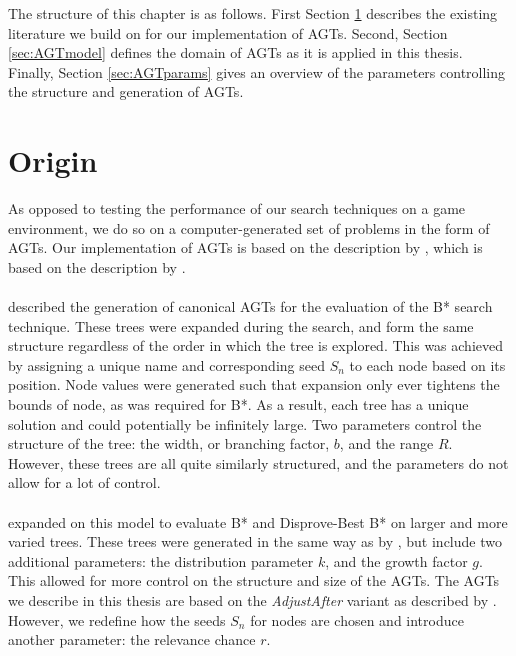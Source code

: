 The structure of this chapter is as follows. First Section \ref{sec:AGTorigin} describes the existing literature we build on for our implementation of AGTs. Second, Section \ref{sec:AGTmodel} defines the domain of AGTs as it is applied in this thesis. Finally, Section \ref{sec:AGTparams} gives an overview of the parameters controlling the structure and generation of AGTs.

\section{Origin}
\label{sec:AGTorigin}
As opposed to testing the performance of our search techniques on a game environment, we do so on a computer-generated set of problems in the form of AGTs. Our implementation of AGTs is based on the description by \cite{Anema2025}, which is based on the description by .

\paragraph{\texorpdfstring{\protect{}}{Berliner (1979)}}
described the generation of canonical AGTs for the evaluation of the B* search technique. These trees were expanded during the search, and form the same structure regardless of the order in which the tree is explored. This was achieved by assigning a unique name and corresponding seed $S_n$ to each node based on its position. Node values were generated such that expansion only ever tightens the bounds of node, as was required for B*. As a result, each tree has a unique solution and could potentially be infinitely large. Two parameters control the structure of the tree: the width, or branching factor, $b$, and the range $R$. However, these trees are all quite similarly structured, and the parameters do not allow for a lot of control.

\paragraph{\texorpdfstring{\protect{}}{Anema (2025)}}
expanded on this model to evaluate B* and Disprove-Best B* on larger and more varied trees. These trees were generated in the same way as by \cite{Berliner1979}, but include two additional parameters: the distribution parameter $k$, and the growth factor $g$. This allowed for more control on the structure and size of the AGTs. The AGTs we describe in this thesis are based on the \textit{AdjustAfter} variant as described by . However, we redefine how the seeds $S_n$ for nodes are chosen and introduce another parameter: the relevance chance $r$.


